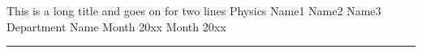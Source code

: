 \documentclass[a4paper,12pt]{book}   %
\author{Samarth Ganesh Kashyap}  %
\begin{document}
\thispagestyle{empty}
\tifrtitle
{This is a long title and}              %
{goes on for two lines}                 %
{Physics}                               %
{Name1 Name2 Name3}                     %
{Department Name}                       %
{Month 20xx}                            %
{Month 20xx}                            %
%
%
%
%
%
\frontmatter
\newpage 
\emptypage
\newpage 
\emptypage
\newpage 
\newpage 
\emptypage
\newpage 

\newpage
\tableofcontents
\newpage 
%
\newpage
{}
\listoffigures

\listoftables
\mainmatter
\renewcommand{\chaptermark}[1]{\markboth{\thechapter.\ #1}{}}
\renewcommand{\headrulewidth}{1pt}        %
\pagestyle{fancy}
\fancyhf{}
\fancyhead[LO, RE]{\thepage}              %
\fancyhead[RO]{\nouppercase{\leftmark}}   %
\fancyhead[LE]{\nouppercase{\rightmark}}  %
\begin{center}\rule{2cm}{2pt}\end{center}
\end{document}

